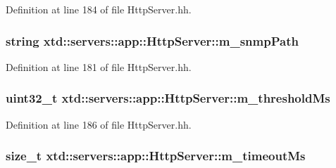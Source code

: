 Definition at line 184 of file Http\-Server.\-hh.

\hypertarget{classxtd_1_1servers_1_1app_1_1HttpServer_a555ce1e115602fda522a5c0a675dace3}{
\subsubsection[{m\-\_\-snmp\-Path}]{\setlength{\rightskip}{0pt plus 5cm}string xtd\-::servers\-::app\-::\-Http\-Server\-::m\-\_\-snmp\-Path\hspace{0.3cm}{\ttfamily [protected]}}}\label{classxtd_1_1servers_1_1app_1_1HttpServer_a555ce1e115602fda522a5c0a675dace3}


Definition at line 181 of file Http\-Server.\-hh.

\hypertarget{classxtd_1_1servers_1_1app_1_1HttpServer_ad7f8a9a0475e17154850c3d575bf6f05}{
\subsubsection[{m\-\_\-threshold\-Ms}]{\setlength{\rightskip}{0pt plus 5cm}uint32\-\_\-t xtd\-::servers\-::app\-::\-Http\-Server\-::m\-\_\-threshold\-Ms\hspace{0.3cm}{\ttfamily [protected]}}}\label{classxtd_1_1servers_1_1app_1_1HttpServer_ad7f8a9a0475e17154850c3d575bf6f05}


Definition at line 186 of file Http\-Server.\-hh.

\hypertarget{classxtd_1_1servers_1_1app_1_1HttpServer_adcaefcc003e9503dbe6ebea90bf70ef7}{
\subsubsection[{m\-\_\-timeout\-Ms}]{\setlength{\rightskip}{0pt plus 5cm}size\-\_\-t xtd\-::servers\-::app\-::\-Http\-Server\-::m\-\_\-timeout\-Ms\hspace{0.3cm}{\ttfamily [protected]}}}\label{classxtd_1_1servers_1_1app_1_1HttpServer_adcaefcc003e9503dbe6ebea90bf70ef7}


